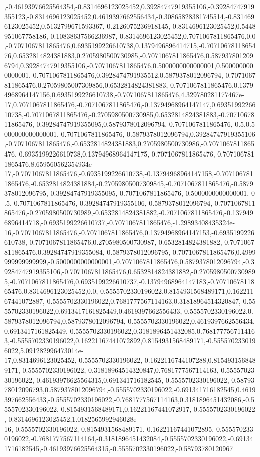 ,-0.46193976625564354,-0.8314696123025452,0.39284747919355106,-0.39284747919355123,-0.8314696123025452,0.4619397662556434,-0.30865828381745514,-0.8314696123025452,0.5132799671593367,-0.2126075236918145,-0.8314696123025452,0.5448951067758186,-0.10838637566236987,-0.8314696123025452,0.7071067811865476,0.0,-0.7071067811865476,0.6935199226610738,0.1379496896414715,-0.7071067811865476,0.6532814824381883,0.2705980500730985,-0.7071067811865476,0.5879378012096794,0.39284747919355106,-0.7071067811865476,0.5000000000000001,0.5000000000000001,-0.7071067811865476,0.3928474791935512,0.5879378012096794,-0.7071067811865476,0.27059805007309856,0.6532814824381883,-0.7071067811865476,0.13794968964147156,0.6935199226610738,-0.7071067811865476,4.329780281177467e-17,0.7071067811865476,-0.7071067811865476,-0.13794968964147147,0.6935199226610738,-0.7071067811865476,-0.2705980500730985,0.6532814824381883,-0.7071067811865476,-0.39284747919355095,0.5879378012096794,-0.7071067811865476,-0.5,0.5000000000000001,-0.7071067811865476,-0.5879378012096794,0.39284747919355106,-0.7071067811865476,-0.6532814824381883,0.2705980500730986,-0.7071067811865476,-0.6935199226610738,0.13794968964147175,-0.7071067811865476,-0.7071067811865476,8.659560562354934e-17,-0.7071067811865476,-0.6935199226610738,-0.13794968964147158,-0.7071067811865476,-0.6532814824381884,-0.27059805007309845,-0.7071067811865476,-0.5879378012096795,-0.39284747919355095,-0.7071067811865476,-0.5000000000000001,-0.5,-0.7071067811865476,-0.39284747919355106,-0.5879378012096794,-0.7071067811865476,-0.2705980500730989,-0.6532814824381882,-0.7071067811865476,-0.1379496896414718,-0.6935199226610737,-0.7071067811865476,-1.29893408435324e-16,-0.7071067811865476,-0.7071067811865476,0.13794968964147153,-0.6935199226610738,-0.7071067811865476,0.2705980500730987,-0.6532814824381882,-0.7071067811865476,0.39284747919355084,-0.5879378012096795,-0.7071067811865476,0.4999999999999999,-0.5000000000000001,-0.7071067811865476,0.5879378012096794,-0.39284747919355106,-0.7071067811865476,0.6532814824381882,-0.27059805007309895,-0.7071067811865476,0.6935199226610737,-0.13794968964147183,-0.7071067811865476,0.8314696123025452,0.0,-0.5555702330196022,0.8154931568489171,0.16221167441072887,-0.5555702330196022,0.7681777567114163,0.31818964514320847,-0.5555702330196022,0.6913417161825449,0.4619397662556433,-0.5555702330196022,0.5879378012096794,0.5879378012096794,-0.5555702330196022,0.4619397662556434,0.6913417161825449,-0.5555702330196022,0.3181896451432085,0.7681777567114163,-0.5555702330196022,0.16221167441072892,0.8154931568489171,-0.5555702330196022,5.091282996473014e-17,0.8314696123025452,-0.5555702330196022,-0.1622116744107288,0.8154931568489171,-0.5555702330196022,-0.31818964514320847,0.7681777567114163,-0.5555702330196022,-0.46193976625564315,0.691341716182545,-0.5555702330196022,-0.5879378012096793,0.5879378012096794,-0.5555702330196022,-0.691341716182545,0.4619397662556433,-0.5555702330196022,-0.7681777567114163,0.3181896451432086,-0.5555702330196022,-0.8154931568489171,0.16221167441072917,-0.5555702330196022,-0.8314696123025452,1.0182565992946028e-16,-0.5555702330196022,-0.8154931568489171,-0.16221167441072895,-0.5555702330196022,-0.7681777567114164,-0.3181896451432084,-0.5555702330196022,-0.691341716182545,-0.46193976625564315,-0.5555702330196022,-0.58793780120967